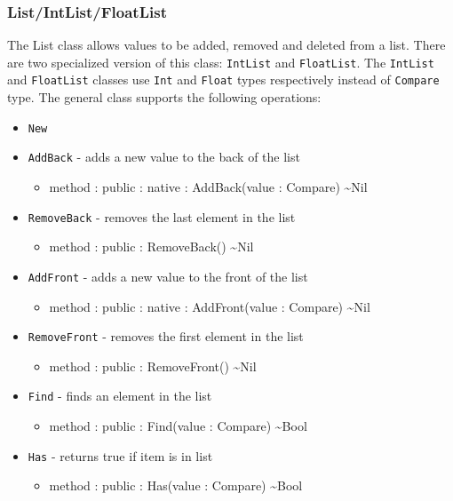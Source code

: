 \documentclass[11pt]{article}
\begin{document}
\subsubsection{List/IntList/FloatList}
The List class allows values to be added, removed and deleted from a
list.  There are two specialized version of this class:
\texttt{IntList} and \texttt{FloatList}.  The \texttt{IntList} and
\texttt{FloatList} classes use \texttt{Int} and \texttt{Float} types
respectively instead of \texttt{Compare} type.  The general class
supports the following operations:
\begin{itemize}
\item \texttt{New}
\item \texttt{AddBack} - adds a new value to the back of the list
  \begin{itemize}
  \item method : public : native : AddBack(value : Compare)
    \textasciitilde Nil
  \end{itemize}
\item \texttt{RemoveBack} - removes the last element in the list
  \begin{itemize}
  \item method : public : RemoveBack() \textasciitilde Nil
  \end{itemize}
\item \texttt{AddFront} - adds a new value to the front of the list
  \begin{itemize}
  \item method : public : native : AddFront(value : Compare)
    \textasciitilde Nil
  \end{itemize}
\item \texttt{RemoveFront} - removes the first element in the list
  \begin{itemize}
  \item method : public : RemoveFront() \textasciitilde Nil
  \end{itemize}
\item \texttt{Find} - finds an element in the list
  \begin{itemize}
  \item method : public : Find(value : Compare) \textasciitilde Bool
  \end{itemize}
\item \texttt{Has} - returns true if item is in list
  \begin{itemize}
  \item method : public : Has(value : Compare) \textasciitilde Bool
  \end{itemize}

\end{itemize}
\end{document}
